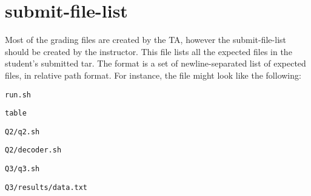 \documentclass[12pt]{article}
\begin{document}
\section{submit-file-list} \label{sec:files}

Most of the grading files are created by the TA, however the submit-file-list should be created by the instructor. This file lists all the expected files in the student's submitted tar. The format is a set of newline-separated list of expected files, in relative path format. For instance, the file might look like the following:

\vspace{5pt}

\texttt{run.sh}

\texttt{table}

\texttt{Q2/q2.sh}

\texttt{Q2/decoder.sh}

\texttt{Q3/q3.sh}

\texttt{Q3/results/data.txt}
\end{document}
